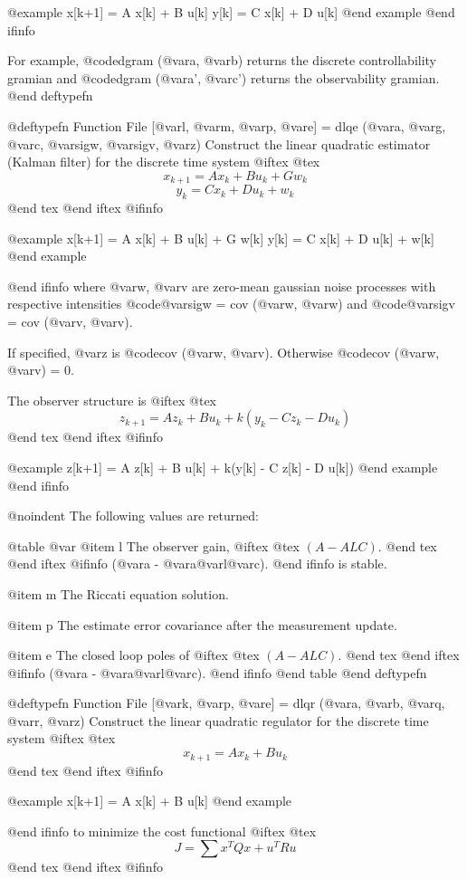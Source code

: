 @example
x[k+1] = A x[k] + B u[k]
  y[k] = C x[k] + D u[k]
@end example
@end ifinfo

For example, @code{dgram (@var{a}, @var{b})} returns the discrete
controllability gramian and @code{dgram (@var{a}', @var{c}')} returns
the observability gramian.
@end deftypefn

@deftypefn {Function File} {[@var{l}, @var{m}, @var{p}, @var{e}] =} dlqe (@var{a}, @var{g}, @var{c}, @var{sigw}, @var{sigv}, @var{z})
Construct the linear quadratic estimator (Kalman filter) for the
discrete time system
@iftex
@tex
$$
 x_{k+1} = A x_k + B u_k + G w_k
$$
$$
 y_k = C x_k + D u_k + w_k
$$
@end tex
@end iftex
@ifinfo

@example
x[k+1] = A x[k] + B u[k] + G w[k]
  y[k] = C x[k] + D u[k] + w[k]
@end example

@end ifinfo
where @var{w}, @var{v} are zero-mean gaussian noise processes with
respective intensities @code{@var{sigw} = cov (@var{w}, @var{w})} and
@code{@var{sigv} = cov (@var{v}, @var{v})}.

If specified, @var{z} is @code{cov (@var{w}, @var{v})}.  Otherwise
@code{cov (@var{w}, @var{v}) = 0}.

The observer structure is
@iftex
@tex
$$
 z_{k+1} = A z_k + B u_k + k(y_k - C z_k - D u_k)
$$
@end tex
@end iftex
@ifinfo

@example
z[k+1] = A z[k] + B u[k] + k(y[k] - C z[k] - D u[k])
@end example
@end ifinfo

@noindent
The following values are returned:

@table @var
@item l
The observer gain, 
@iftex
@tex
$(A - ALC)$.
@end tex
@end iftex
@ifinfo
(@var{a} - @var{a}@var{l}@var{c}).
@end ifinfo
is stable.

@item m
The Riccati equation solution.

@item p
The estimate error covariance after the measurement update.

@item e
The closed loop poles of
@iftex
@tex
$(A - ALC)$.
@end tex
@end iftex
@ifinfo
(@var{a} - @var{a}@var{l}@var{c}).
@end ifinfo
@end table
@end deftypefn

@deftypefn {Function File} {[@var{k}, @var{p}, @var{e}] =} dlqr (@var{a}, @var{b}, @var{q}, @var{r}, @var{z})
Construct the linear quadratic regulator for the discrete time system
@iftex
@tex
$$
 x_{k+1} = A x_k + B u_k
$$
@end tex
@end iftex
@ifinfo

@example
x[k+1] = A x[k] + B u[k]
@end example

@end ifinfo
to minimize the cost functional
@iftex
@tex
$$
 J = \sum x^T Q x + u^T R u
$$
@end tex
@end iftex
@ifinfo

